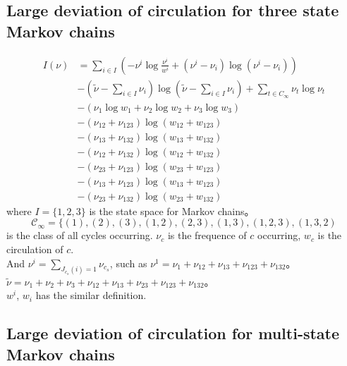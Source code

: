 \documentclass[11pt,en,cite=authoryear]{elegantpaper}
\begin{document}
\subsection{Large deviation of circulation for three state Markov chains}
\begin{align*}
    I(\nu) 
    &= \sum_{i \in I} \left(-\nu^{i} \log \frac{\nu^{i}}{w^{i}} + (\nu^{i} - \nu_{i}) \log(\nu^{i} - \nu_{i})\right) \\
    &-(\tilde{\nu} - \sum_{i \in I} \nu_i) \log (\tilde{\nu} - \sum_{i \in I} \nu_i)
    +\sum_{t \in C_{\infty}} \nu_t \log \nu_t \\
    &- (\nu_{1} \log w_{1} + \nu_{2} \log w_{2} + \nu_{3} \log w_{3})\\
    &- (\nu_{12} + \nu_{123}) \log(w_{12} + w_{123}) \\
    &- (\nu_{13} + \nu_{132}) \log(w_{13} + w_{132}) \\
    &- (\nu_{12} + \nu_{132}) \log(w_{12} + w_{132}) \\
    &- (\nu_{23} + \nu_{123}) \log(w_{23} + w_{123}) \\
    &- (\nu_{13} + \nu_{123}) \log(w_{13} + w_{123}) \\
    &- (\nu_{23} + \nu_{132}) \log(w_{23} + w_{132}) 
\end{align*}
where $I=\{1, 2, 3\}$ is the state space for Markov chains。
$$\mathcal{C}_{\infty} = \{(1), (2), (3), (1,2), (2,3), (1,3), (1,2,3), (1,3,2)$$
is the class of all cycles occurring.
$\nu_c$ is the frequence of $c$ occurring, $w_c$ is the circulation of $c$.\\
And $\nu^{i} = \sum_{J_{c_s}(i)=1} \nu_{c_s}$, such as $\nu^{1} = \nu_{1} + \nu_{12} + \nu_{13} + \nu_{123} +\nu_{132}$。
$\tilde{\nu} = \nu_{1} + \nu_{2} + \nu_{3} + \nu_{12} + \nu_{13} + \nu_{23} + \nu_{123} +\nu_{132}$。\\
$w^i$, $w_i$ has the similar definition.

\subsection{Large deviation of circulation for multi-state Markov chains}
\end{document}
